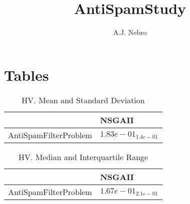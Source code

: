 \documentclass{article}
\title{AntiSpamStudy}
\author{A.J. Nebro}
\begin{document}
\maketitle
\section{Tables}

\begin{table}
\caption{HV. Mean and Standard Deviation}
\label{table: HV}
\centering
\begin{scriptsize}
\begin{tabular}{ll}
\hline &  NSGAII\\
\hline 
AntiSpamFilterProblem & \cellcolor{gray95}$  1.83e-01_{ 1.4e-01}$ \\
\hline
\end{tabular}
\end{scriptsize}
\end{table}

\begin{table}
\caption{HV. Median and Interquartile Range}
\label{table: HV}
\centering
\begin{scriptsize}
\begin{tabular}{ll}
\hline &  NSGAII\\
\hline 
AntiSpamFilterProblem & \cellcolor{gray95}$  1.67e-01_{ 2.1e-01}$ \\
\hline
\end{tabular}
\end{scriptsize}
\end{table}
\end{document}
